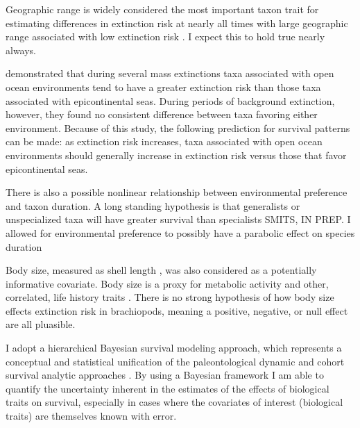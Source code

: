 \documentclass[12pt,letterpaper]{article}
\begin{document}
Geographic range is widely considered the most important taxon trait for estimating differences in extinction risk at nearly all times with large geographic range associated with low extinction risk \citep{Jablonski1986,Jablonski1987,Jablonski2003,Payne2007}. I expect this to hold true nearly always.

\citet{Miller2009a} demonstrated that during several mass extinctions taxa associated with open ocean environments tend to have a greater extinction risk than those taxa associated with epicontinental seas. During periods of background extinction, however, they found no consistent difference between taxa favoring either environment. Because of this study, the following prediction for survival patterns can be made: as extinction risk increases, taxa associated with open ocean environments should generally increase in extinction risk versus those that favor epicontinental seas.

There is also a possible nonlinear relationship between environmental preference and taxon duration. A long standing hypothesis is that generalists or unspecialized taxa will have greater survival than specialists \citep{Simpson1944,Liow2004a,Liow2007b,Nurnberg2013a,Nurnberg2015,Baumiller1993} \uppercase{Smits, in prep}. I allowed for environmental preference to possibly have a parabolic effect on species duration 

Body size, measured as shell length \citep{Payne2014}, was also considered as a potentially informative covariate. Body size is a proxy for metabolic activity and other, correlated, life history traits \citep{Payne2014}. There is no strong hypothesis of how body size effects extinction risk in brachiopods, meaning a positive, negative, or null effect are all pluasible.

I adopt a hierarchical Bayesian survival modeling approach, which represents a conceptual and statistical unification of the paleontological dynamic and cohort survival analytic approaches \citep{VanValen1973,VanValen1979,Raup1978,Raup1975,Foote1988,Baumiller1993,Simpson2006}. By using a Bayesian framework I am able to quantify the uncertainty inherent in the estimates of the effects of biological traits on survival, especially in cases where the covariates of interest (biological traits) are themselves known with error. 
\end{document}
